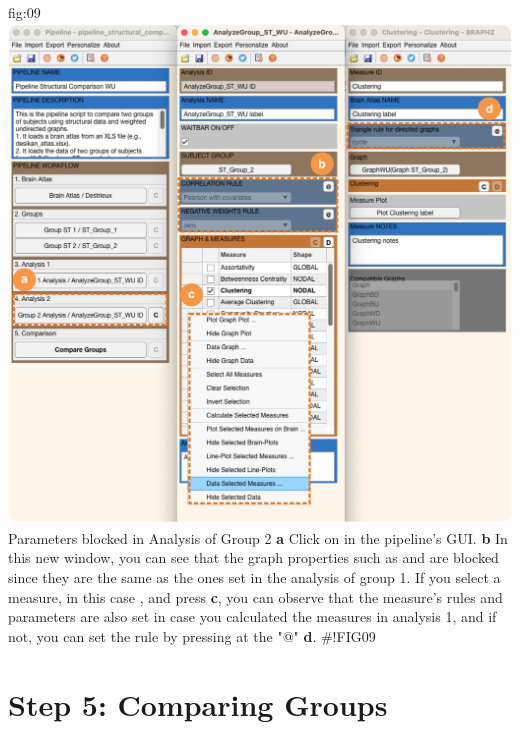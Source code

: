 \documentclass[justified]{tufte-handout}
\begin{document}
{fig:09}
{\includegraphics{fig09.jpg}
}
{Parameters blocked in Analysis of Group 2}
{
	{\bf a} Click on  in the pipeline's GUI.
	{\bf b} In this new window, you can see that the graph properties such as  and  are blocked since they are the same as the ones set in the analysis of group 1. If you select a measure, in this case , and press  {\bf c}, you can observe that the measure's rules and parameters are also set in case you calculated the measures in analysis 1, and if not, you can set the rule by pressing at the "@" {\bf d}.
}
#!FIG09
 
\section{Step 5: Comparing Groups}
\end{document}
